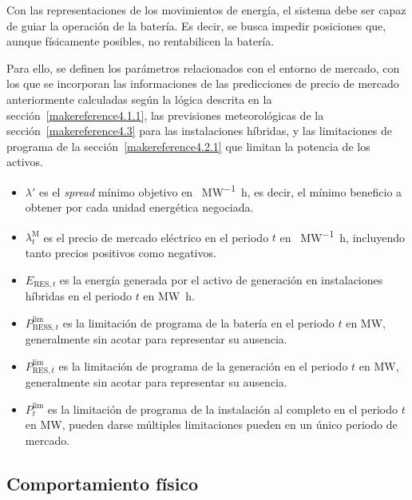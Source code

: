 Con las representaciones de los movimientos de energía, el sistema debe ser capaz de guiar la operación de la batería. Es decir, se busca impedir posiciones que, aunque físicamente posibles, no rentabilicen la batería.

Para ello, se definen los parámetros relacionados con el entorno de mercado, con los que se incorporan las informaciones de las predicciones de precio de mercado anteriormente calculadas según la lógica descrita en la sección~\ref{makereference4.1.1}, las previsiones meteorológicas de la sección~\ref{makereference4.3} para las instalaciones híbridas, y las limitaciones de programa de la sección~\ref{makereference4.2.1} que limitan la potencia de los activos.

\begin{itemize}

  \item \( \lambda' \) es el \textit{spread} mínimo objetivo en \si{\text{\euro}\per\mega\watt\hour}, es decir, el mínimo beneficio a obtener por cada unidad energética negociada.

  \item \( \lambda^{\mathrm{M}}_{t} \) es el precio de mercado eléctrico en el periodo \( t \) en \si{\text{\euro}\per\mega\watt\hour}, incluyendo tanto precios positivos como negativos.

  \item \( E_{\mathrm{RES}, t} \) es la energía generada por el activo de generación en instalaciones híbridas en el periodo \( t \) en \si{{\mega\watt\hour}}.

  \item \( P^{\text{lim}}_{\mathrm{BESS}, t} \) es la limitación de programa de la batería en el periodo \( t \) en \si{\mega\watt}, generalmente sin acotar para representar su ausencia.

  \item \( P^{\text{lim}}_{\mathrm{RES}, t} \) es la limitación de programa de la generación en el periodo \( t \) en \si{\mega\watt}, generalmente sin acotar para representar su ausencia.

  \item \( P^{\text{lim}}_{t} \) es la limitación de programa de la instalación al completo en el periodo \( t \) en \si{\mega\watt}, pueden darse múltiples limitaciones pueden en un único periodo de mercado.

\end{itemize}

\subsection{Comportamiento físico}%
\label{makereference5.1.5}

